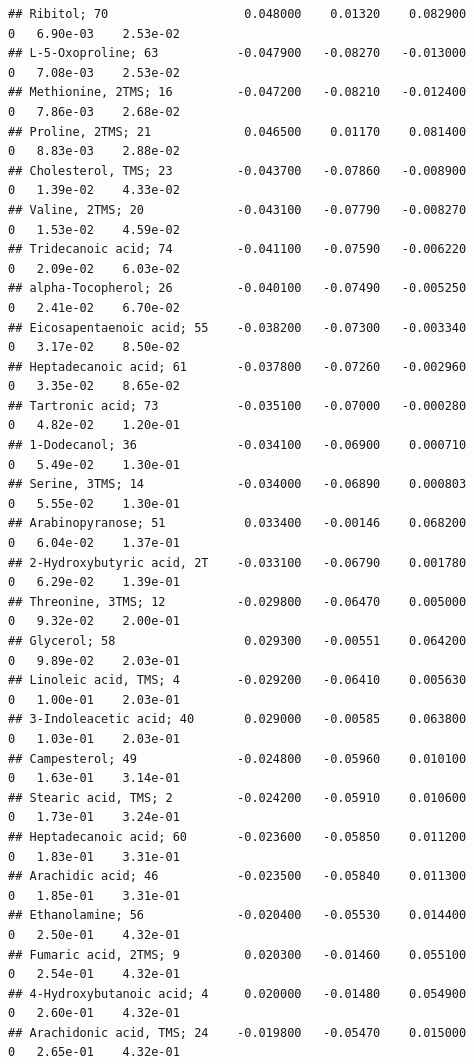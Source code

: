 \documentclass[]{article}
\begin{document}
\begin{verbatim}
## Ribitol; 70                   0.048000    0.01320    0.082900         0   6.90e-03    2.53e-02
## L-5-Oxoproline; 63           -0.047900   -0.08270   -0.013000         0   7.08e-03    2.53e-02
## Methionine, 2TMS; 16         -0.047200   -0.08210   -0.012400         0   7.86e-03    2.68e-02
## Proline, 2TMS; 21             0.046500    0.01170    0.081400         0   8.83e-03    2.88e-02
## Cholesterol, TMS; 23         -0.043700   -0.07860   -0.008900         0   1.39e-02    4.33e-02
## Valine, 2TMS; 20             -0.043100   -0.07790   -0.008270         0   1.53e-02    4.59e-02
## Tridecanoic acid; 74         -0.041100   -0.07590   -0.006220         0   2.09e-02    6.03e-02
## alpha-Tocopherol; 26         -0.040100   -0.07490   -0.005250         0   2.41e-02    6.70e-02
## Eicosapentaenoic acid; 55    -0.038200   -0.07300   -0.003340         0   3.17e-02    8.50e-02
## Heptadecanoic acid; 61       -0.037800   -0.07260   -0.002960         0   3.35e-02    8.65e-02
## Tartronic acid; 73           -0.035100   -0.07000   -0.000280         0   4.82e-02    1.20e-01
## 1-Dodecanol; 36              -0.034100   -0.06900    0.000710         0   5.49e-02    1.30e-01
## Serine, 3TMS; 14             -0.034000   -0.06890    0.000803         0   5.55e-02    1.30e-01
## Arabinopyranose; 51           0.033400   -0.00146    0.068200         0   6.04e-02    1.37e-01
## 2-Hydroxybutyric acid, 2T    -0.033100   -0.06790    0.001780         0   6.29e-02    1.39e-01
## Threonine, 3TMS; 12          -0.029800   -0.06470    0.005000         0   9.32e-02    2.00e-01
## Glycerol; 58                  0.029300   -0.00551    0.064200         0   9.89e-02    2.03e-01
## Linoleic acid, TMS; 4        -0.029200   -0.06410    0.005630         0   1.00e-01    2.03e-01
## 3-Indoleacetic acid; 40       0.029000   -0.00585    0.063800         0   1.03e-01    2.03e-01
## Campesterol; 49              -0.024800   -0.05960    0.010100         0   1.63e-01    3.14e-01
## Stearic acid, TMS; 2         -0.024200   -0.05910    0.010600         0   1.73e-01    3.24e-01
## Heptadecanoic acid; 60       -0.023600   -0.05850    0.011200         0   1.83e-01    3.31e-01
## Arachidic acid; 46           -0.023500   -0.05840    0.011300         0   1.85e-01    3.31e-01
## Ethanolamine; 56             -0.020400   -0.05530    0.014400         0   2.50e-01    4.32e-01
## Fumaric acid, 2TMS; 9         0.020300   -0.01460    0.055100         0   2.54e-01    4.32e-01
## 4-Hydroxybutanoic acid; 4     0.020000   -0.01480    0.054900         0   2.60e-01    4.32e-01
## Arachidonic acid, TMS; 24    -0.019800   -0.05470    0.015000         0   2.65e-01    4.32e-01

\end{verbatim}
\end{document}
